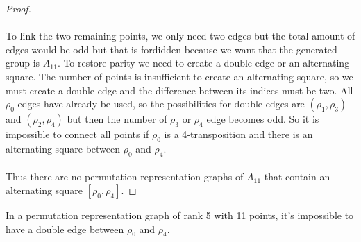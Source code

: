 \begin{proof}
\begin{figure}[H]
\begin{center}
\begin{tikzpicture}[scale=.8]
      \end{tikzpicture}
      \caption{}
    \end{center}
  \end{figure}

  \paragraph{}
  To link the two remaining points, we only need two edges but the total amount of edges would be odd but that is fordidden because we want that the generated group is $A_{11}$. To restore parity we need to create a double edge or an alternating square. The number of points is insufficient to create an alternating square, so we must create a double edge and the difference between its indices must be two. All $\rho_0$ edges have already be used, so the possibilities for double edges are $(\rho_1, \rho_3)$ and $(\rho_2, \rho_4)$ but then the number of $\rho_3$ or $\rho_4$ edge becomes odd. So it is impossible to connect all points if $\rho_0$ is a 4-transposition and there is an alternating square between $\rho_0$ and $\rho_4$.

  \paragraph{}
  Thus there are no permutation representation graphs of $A_{11}$ that contain an alternating square $[\rho_0, \rho_4]$.
\end{proof}

\begin{lemma}
  \label{lemma-forbidden-double-edge}
  In a permutation representation graph of rank 5 with 11 points, it's impossible to have a double edge between $\rho_0$ and $\rho_4$.
\end{lemma}


